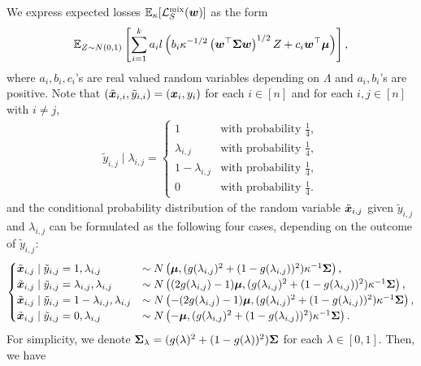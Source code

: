 We express expected losses $\mathbb{E}_\kappa[\mathcal{L}_S^\mathrm{mix}({\bm{w}})]$ as the form
\begin{equation}\label{eqn:mix_form}
 \mathbb{E}_{Z \sim N(0,1)}\left[ \sum_{i=1}^k a_i l\left( b_i \kappa^{-1/2} \left({\bm{w}}^\top {\bm{\Sigma}} {\bm{w}} \right)^{1/2} Z + c_i {\bm{w}}^\top {\bm{\mu}} \right) \right],
\end{equation}
where $a_i,b_i,c_i$'s are real valued random variables depending on $\Lambda$ and $a_i, b_i$'s are positive.
Note that $(\tilde{{\bm{x}}}_{i,i}, \tilde{y}_{i,i}) = ({\bm{x}}_i,y_i)$ for each $i\in [n]$ and for each $i,j \in [n]$ with $i \neq j$,
\begin{align}\label{eqn:mix_1}
    \tilde{y}_{i,j} \mid \lambda_{i,j} = 
    \begin{cases}
    1 &\text{with probability } \frac{1}{4},\\
    \lambda_{i,j} &\text{with probability } \frac{1}{4},\\
    1-\lambda_{i,j} &\text{with probability }\frac{1}{4},\\
    0 &\text{with probability } \frac{1}{4}.
    \end{cases}
\end{align}
and the conditional probability distribution of the random variable $\tilde{{\bm{x}}}_{i,j}$ given $\tilde{y}_{i,j}$ and $\lambda_{i,j}$ can be formulated as the following four cases, depending on the outcome of $\tilde{y}_{i,j}$:
\begin{align}\label{eqn:mix_2}
    \begin{cases}
    \tilde{{\bm{x}}}_{i,j} \mid \tilde{y}_{i,j}=1, \lambda_{i,j} &\sim  N \left ( {\bm{\mu}}, (g(\lambda_{i,j})^2 +(1-g(\lambda_{i,j}))^2) \kappa^{-1}{\bm{\Sigma}} \right ),\\
    \tilde{{\bm{x}}}_{i,j} \mid \tilde{y}_{i,j}=\lambda_{i,j}, \lambda_{i,j} &\sim  N \left ( (2g(\lambda_{i,j})-1){\bm{\mu}}, (g(\lambda_{i,j})^2 + (1-g(\lambda_{i,j}))^2) \kappa^{-1} {\bm{\Sigma}} \right ),\\
    \tilde{{\bm{x}}}_{i,j} \mid \tilde{y}_{i,j}=1-\lambda_{i,j}, \lambda_{i,j} &\sim  N \left ( -(2g(\lambda_{i,j})-1){\bm{\mu}}, (g(\lambda_{i,j})^2 + (1-g(\lambda_{i,j}))^2) \kappa^{-1} {\bm{\Sigma}} \right ),\\
    \tilde{{\bm{x}}}_{i,j} \mid \tilde{y}_{i,j}=0, \lambda_{i,j} &\sim  N \left ( -{\bm{\mu}}, (g(\lambda_{i,j})^2 +(1-g(\lambda_{i,j}))^2) \kappa^{-1} {\bm{\Sigma}} \right ).
    \end{cases}
\end{align}
For simplicity, we denote ${\bm{\Sigma}}_\lambda = (g(\lambda)^2 + (1-g(\lambda))^2) {\bm{\Sigma}}$ for each $\lambda \in [0,1]$. Then, we have 
